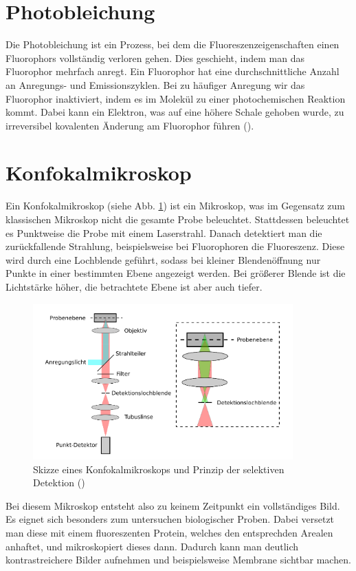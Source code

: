 \section{Photobleichung}

Die Photobleichung ist ein Prozess, bei dem die Fluoreszenzeigenschaften einen Fluorophors vollständig verloren gehen. 
Dies geschieht, indem man das Fluorophor mehrfach anregt. Ein Fluorophor hat eine durchschnittliche Anzahl an Anregungs- und Emissionszyklen. 
Bei zu häufiger Anregung wir das Fluorophor inaktiviert, indem es im Molekül zu einer photochemischen 
Reaktion kommt. Dabei kann ein Elektron, was auf eine höhere Schale gehoben wurde, zu irreversibel kovalenten Änderung am 
Fluorophor führen (\cite{Song1995}).

\section{Konfokalmikroskop}

Ein Konfokalmikroskop (siehe Abb. \ref{bild:Konfokalmikroskop}) ist ein Mikroskop, was im Gegensatz zum klassischen Mikroskop nicht die gesamte Probe beleuchtet. 
Stattdessen beleuchtet es Punktweise die Probe mit einem Laserstrahl. Danach detektiert man die zurückfallende Strahlung, 
beispielsweise bei Fluorophoren die Fluoreszenz. Diese wird durch eine Lochblende geführt, sodass bei kleiner 
Blendenöffnung nur Punkte in einer bestimmten Ebene angezeigt werden. Bei größerer Blende ist die Lichtstärke höher, die betrachtete Ebene ist aber auch tiefer. 

\begin{figure}[ht]
    \centering
    \includegraphics[width = 10cm]{Bilder/Grundlagen/Konfokalmikroskop.png}
    \caption{Skizze eines Konfokalmikroskops und Prinzip der selektiven Detektion (\cite{FRETSkript})}
    \label{bild:Konfokalmikroskop}
\end{figure}

Bei diesem Mikroskop entsteht also zu keinem Zeitpunkt ein vollständiges Bild. Es eignet sich besonders zum untersuchen biologischer Proben. 
Dabei versetzt man diese mit einem fluoreszenten Protein, welches den entsprechden Arealen anhaftet, und mikroskopiert dieses dann. Dadurch kann man 
deutlich kontrastreichere Bilder aufnehmen und beispielsweise Membrane sichtbar machen. 